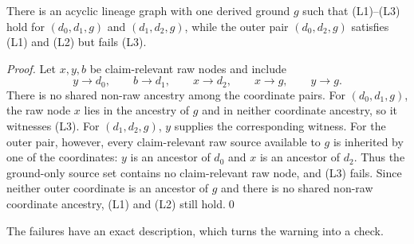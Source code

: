 \documentclass[smallextended,envcountsect,envcountsame,natbib]{svjour3}
\begin{document}
\begin{proposition}\label{ex:prop:l3-noncompose}
There is an acyclic lineage graph with one derived ground $g$ such that (L1)--(L3) hold for $(d_0,d_1,g)$ and $(d_1,d_2,g)$, while the outer pair $(d_0,d_2,g)$ satisfies (L1) and (L2) but fails (L3).
\end{proposition}
\begin{proof}
Let $x,y,b$ be claim-relevant raw nodes and include
\[
y\to d_0,\qquad b\to d_1,\qquad x\to d_2,\qquad x\to g,\qquad y\to g.
\]
There is no shared non-raw ancestry among the coordinate pairs. For $(d_0,d_1,g)$, the raw node $x$ lies in the ancestry of $g$ and in neither coordinate ancestry, so it witnesses (L3). For $(d_1,d_2,g)$, $y$ supplies the corresponding witness. For the outer pair, however, every claim-relevant raw source available to $g$ is inherited by one of the coordinates: $y$ is an ancestor of $d_0$ and $x$ is an ancestor of $d_2$. Thus the ground-only source set contains no claim-relevant raw node, and (L3) fails. Since neither outer coordinate is an ancestor of $g$ and there is no shared non-raw coordinate ancestry, (L1) and (L2) still hold.\qed
\end{proof}

The failures have an exact description, which turns the warning into a check.
\end{document}
